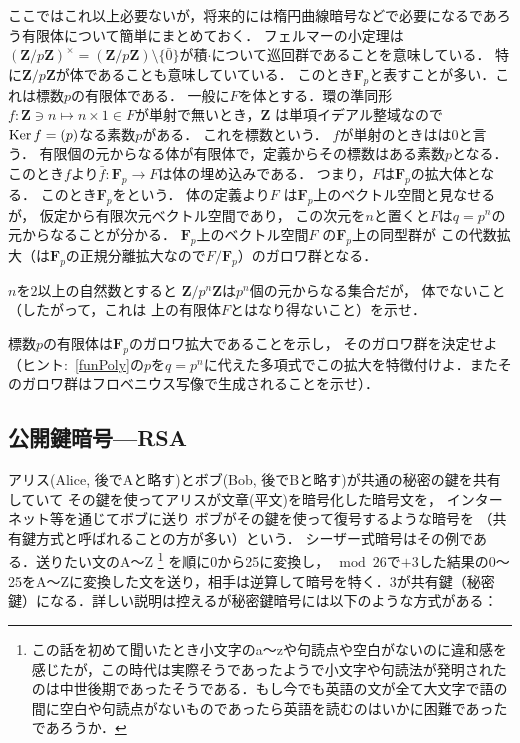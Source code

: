 ここではこれ以上必要ないが，将来的には楕円曲線暗号などで必要になるであろう有限体について簡単にまとめておく．
フェルマーの小定理は$(\mathbf Z/p\mathbf Z)^{\times}=(\mathbf Z/p\mathbf Z)\setminus \{\bar 0\}$が積$\cdot$について巡回群であることを意味している．
特に$\mathbf Z/p\mathbf Z$が体であることも意味していている．
このとき$\mathbf F_p$と表すことが多い．これは標数$p$の有限体である．
一般に$F$を体とする．環の準同形
$f:\mathbf Z\ni n\mapsto n\times 1\in F$が単射で無いとき，$\mathbf Z$ は単項イデアル整域なので$\operatorname{Ker} f=(p)$なる素数$p$がある．
これを標数という．
$f$が単射のときはは$0$と言う．
有限個の元からなる体が有限体で，定義からその標数はある素数$p$となる．
このとき$f$より$\bar f:\mathbf F_p\to F$は体の埋め込みである．
つまり，$F$は$\mathbf F_p$の拡大体となる．
このとき$\mathbf F_p$をという．
体の定義より$F$ は$\mathbf F_p$上のベクトル空間と見なせるが，
仮定から有限次元ベクトル空間であり，
この次元を$n$と置くと$F$は$q=p^n$の元からなることが分かる．
$\mathbf F_p$上のベクトル空間$F$ の$\mathbf F_p$上の同型群が
この代数拡大（は$\mathbf F_p$の正規分離拡大なので$F/\mathbf F_p$）のガロワ群となる．

\begin{Q}
   $n$を$2$以上の自然数とすると
   $\mathbf Z/p^n\mathbf Z$は$p^n$個の元からなる集合だが，
   体でないこと（したがって，これは
   上の有限体$F$とはなり得ないこと）を示せ．
\end{Q}


\begin{exQ}
   標数$p$の有限体は$\mathbf F_p$のガロワ拡大であることを示し，
   そのガロワ群を決定せよ（ヒント$:$
    \eqref{funPoly}の$p$を$q=p^n$に代えた多項式でこの拡大を特徴付けよ．またそのガロワ群はフロベニウス写像で生成されることを示せ）．
\end{exQ}


\subsection{公開鍵暗号---RSA}
アリス(Alice, 後でAと略す)とボブ(Bob, 後でBと略す)が共通の秘密の鍵を共有していて
その鍵を使ってアリスが文章(平文)を暗号化した暗号文を，
インターネット等を通じてボブに送り
ボブがその鍵を使って復号するような暗号を
（共有鍵方式と呼ばれることの方が多い）という．
シーザー式暗号はその例である．送りたい文のA〜Z \footnote{この話を初めて聞いたとき小文字のa〜zや句読点や空白がないのに違和感を感じたが，この時代は実際そうであったようで小文字や句読法が発明されたのは中世後期であったそうである．もし今でも英語の文が全て大文字で語の間に空白や句読点がないものであったら英語を読むのはいかに困難であったであろうか．}
を順に0から25に変換し，$\mod 26$で$+3$した結果の0〜25をA〜Zに変換した文を送り，相手は逆算して暗号を特く．$3$が共有鍵（秘密鍵）になる．詳しい説明は控えるが秘密鍵暗号には以下のような方式がある：


